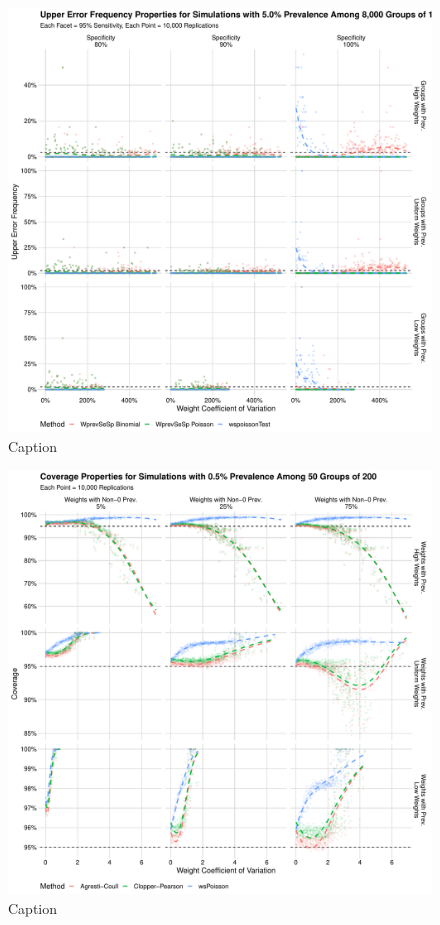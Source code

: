 \documentclass[AMA,STIX1COL]{WileyNJD-v2}
\begin{document}
\begin{figure}
\centering
\includegraphics[width=\textwidth]{figures/imperfect_upper_error_frequency_8000_groups_0_05_prev.pdf}
\caption{Caption}
\label{fig:imperfect_upper_error_frequency_8000_groups_0_05_prev}
\end{figure}

\begin{figure}
\centering
\includegraphics[width=\textwidth]{figures/perfect_coverage_50_groups_0_005_prev.pdf}
\caption{Caption}
\label{fig:perfect_coverage_50_groups_0_005_prev}
\end{figure}
\end{document}
